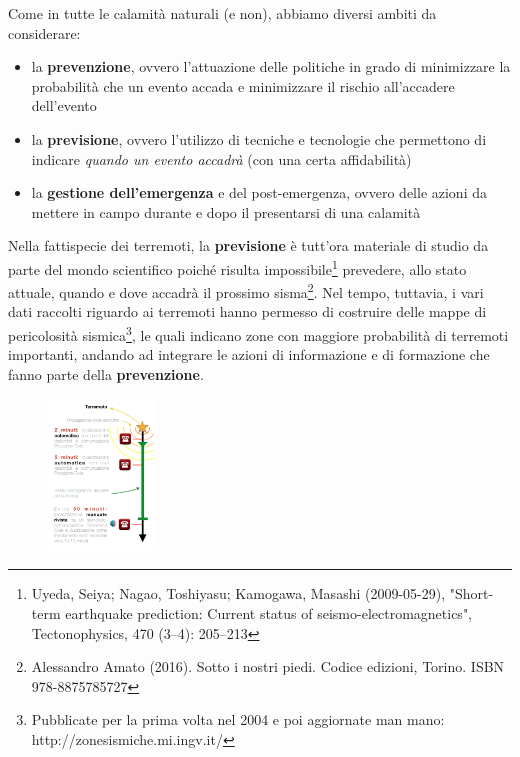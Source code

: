 \documentclass[a4paper,10pt]{memoir}
\begin{document}
Come in tutte le calamità naturali (e non), abbiamo diversi ambiti da considerare:
\begin{itemize}
\item la \textbf{prevenzione}, ovvero l'attuazione delle politiche in grado di minimizzare la probabilità che un evento accada e minimizzare il rischio all'accadere dell'evento
\item la \textbf{previsione}, ovvero l'utilizzo di tecniche e tecnologie che permettono di indicare \textit{quando un evento accadrà} (con una certa affidabilità)
\item la \textbf{gestione dell'emergenza} e del post-emergenza, ovvero delle azioni da mettere in campo durante e dopo il presentarsi di una calamità
\end{itemize}

Nella fattispecie dei terremoti, la \textbf{previsione} è tutt'ora materiale di studio da parte del mondo scientifico poiché risulta impossibile\footnote{Uyeda, Seiya; Nagao, Toshiyasu; Kamogawa, Masashi (2009-05-29), "Short-term earthquake prediction: Current status of seismo-electromagnetics", Tectonophysics, 470 (3–4): 205–213} prevedere, allo stato attuale, quando e dove accadrà il prossimo sisma\footnote{Alessandro Amato (2016). Sotto i nostri piedi. Codice edizioni, Torino. ISBN 978-8875785727}. Nel tempo, tuttavia, i vari dati raccolti riguardo ai terremoti hanno permesso di costruire delle mappe di pericolosità sismica\footnote{Pubblicate per la prima volta nel 2004 e poi aggiornate man mano: http://zonesismiche.mi.ingv.it/}, le quali indicano zone con maggiore probabilità di terremoti importanti, andando ad integrare le azioni di informazione e di formazione che fanno parte della \textbf{prevenzione}.

\begin{figure}
\centering
\label{fig:timelinecom}
\includegraphics[width=0.25\textwidth]{introduzione/tempi_comunicazioni}
\end{figure}
\end{document}
